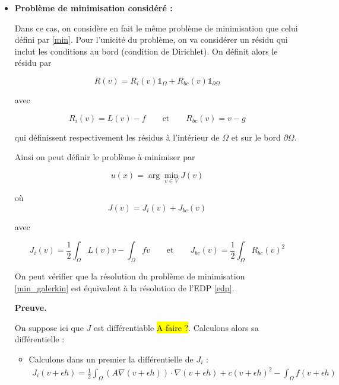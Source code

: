 \documentclass[french]{article}
\newenvironment{preuve}[1][]{\begin{tcolorbox}[
	colback=white, %
	colframe=green!70!black, %
	arc=2mm, %
	boxrule=1pt, %
	breakable, enhanced jigsaw
	]
	\textcolor{green!70!black}{\textbf{Preuve.} \\}

	#1
}{\end{tcolorbox}}
\begin{document}
	\begin{itemize}[label=]
		\item \textbf{Problème de minimisation considéré :}
		
		Dans ce cas, on considère en fait le même problème de minimisation que celui défini par \eqref{min}. Pour l'unicité du problème, on va considérer un résidu qui inclut les conditions au bord (condition de Dirichlet). On définit alors le résidu par
		
		\begin{equation*}
			R(v) = R_i(v)\mathbb{1}_{\Omega} + R_{bc}(v)\mathbb{1}_{\partial \Omega}
		\end{equation*}
	
		avec 
		
		\begin{equation*}
			R_i(v)=L(v) - f \qquad \text{et} \qquad R_{bc}(v)=v-g
		\end{equation*}
		
		qui définissent respectivement les résidus à l'intérieur de $\Omega$ et sur le bord $\partial\Omega$. 
		
		Ainsi on peut définir le problème à minimiser par

		\begin{equation}
			u(x)=\arg\min_{v \in V}J(v) \label{min_galerkin}
		\end{equation}
	
		où
		\begin{equation*}
			J(v)=J_i(v)+J_{bc}(v) 
		\end{equation*}
		
		avec 
		
		\begin{equation*}
			J_i(v)=\frac{1}{2}\int_\Omega L(v)v - \int_\Omega fv  \qquad \text{et} \qquad J_{bc}(v)=\frac{1}{2}\int_\Omega R_{bc}(v)^2
		\end{equation*}

		On peut vérifier que la résolution du problème de minimisation \eqref{min_galerkin} est équivalent à la résolution de l'EDP \eqref{edp}.
		
		\begin{preuve}
			On suppose ici que $J$ est différentiable \hl{A faire ?}. Calculons alors sa différentielle :
			
			\begin{itemize}[label=\textbullet]
				\item Calculons dans un premier la différentielle de $J_{i}$ :
				\begin{align*}
					J_i(v+\epsilon h)=\frac{1}{2} \int_{\Omega} (A\nabla(v+\epsilon h)) \cdot \nabla(v+\epsilon h) + c(v+\epsilon h)^2 - \int_{\Omega} f(v+\epsilon h)
				\end{align*}
	

\end{itemize}
\end{preuve}
\end{itemize}
\end{document}
